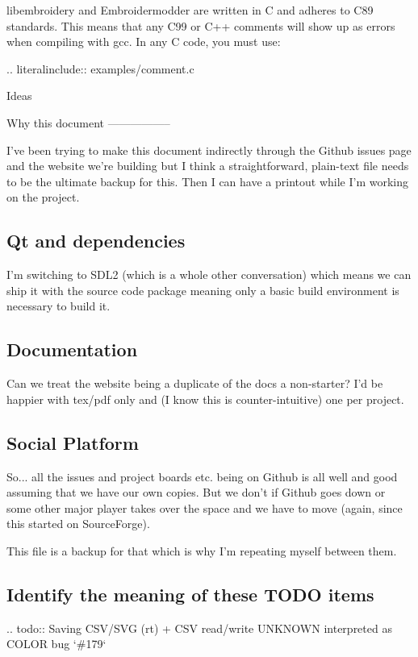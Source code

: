 \documentclass[a4paper]{report}
\begin{document}
libembroidery and Embroidermodder are written in C and adheres to C89 standards. This means
that any C99 or C++ comments will show up as errors when compiling with
gcc. In any C code, you must use:

.. literalinclude:: examples/comment.c

Ideas
~~~~~

Why this document
-----------------

I've been trying to make this document indirectly through the Github
issues page and the website we're building but I think a
straightforward, plain-text file needs to be the ultimate backup for
this. Then I can have a printout while I'm working on the project.

\subsection{Qt and dependencies}

I'm switching to SDL2 (which is a whole other conversation) which means
we can ship it with the source code package meaning only a basic build
environment is necessary to build it.

\subsection{Documentation}

Can we treat the website being a duplicate of the docs a non-starter?
I'd be happier with tex/pdf only and (I know this is counter-intuitive)
one per project.

\subsection{Social Platform}

So... all the issues and project boards etc. being on Github is all
well and good assuming that we have our own copies. But we don't if
Github goes down or some other major player takes over the space and we
have to move (again, since this started on SourceForge).

This file is a backup for that which is why I'm repeating myself between
them.

\subsection{Identify the meaning of these TODO items}

.. todo::
   Saving CSV/SVG (rt) + CSV read/write UNKNOWN interpreted as COLOR bug `\#179`
\end{document}
